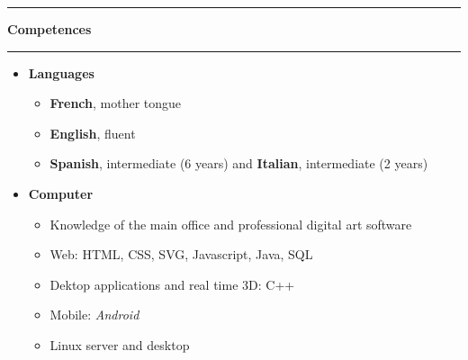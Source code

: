\documentclass[a4paper,11pt]{article} %
\newcommand{\trad}[2]{#1}
\newcommand{\titre}[1]{%
	\begin{center}
	\rule{\textwidth}{1pt}
	\par
	\vspace{0.1cm}
        \textbf{\large #1}
	\par\rule{\textwidth}{1pt}
	\end{center}
	}
\newenvironment{customitemize}[0]
  { \begin{itemize}
    \addtolength{\itemsep}{\trad{-0.2}{0}\baselineskip}
    \addtolength{\baselineskip}{\trad{-0.2}{0}\baselineskip} }
  { \end{itemize} }
\begin{document}
\titre{\trad{Competences}{Compétences}}

\begin{customitemize}
\item \textbf{\trad{Languages}{Langues}}
	\begin{itemize} 
	\trad{\item \textbf{French}, mother tongue}{}
	\item \trad{\textbf{English}, fluent} %
				{\textbf{Anglais}, autonome} %
	\item \trad{\textbf{Spanish}, intermediate (6 years) and \textbf{Italian}, intermediate (2 years)}
				{\textbf{Espagnol}, niveau intermédiaire (6 années d'études) et \textbf{Italien}, niveau intermédiaire (2 années d'études)}
	\end{itemize}
\item \textbf{\trad{Computer}{Informatique}}
	\begin{itemize}
	\item \trad{Knowledge of the main office and professional digital art software}             {Maîtrise des principaux outils de bureautique et d'infographie professionnelle}
	\item \trad{Web: HTML, CSS, SVG, Javascript, Java, SQL}										{Programmation web : HTML, CSS, SVG, Javascript, Java, SQL}
	\item \trad{Dektop applications and real time 3D: C++}										{C++ (applications de bureau, 3D temps réel)}
	\item \trad{Mobile: \textit{Android}}									  					{Programmation mobile : \textit{Android}}
	\item \trad{Linux server and desktop}                                                       {Utilisation quotidienne d'environnements Linux et administration de serveurs Linux}
	\end{itemize}
\end{customitemize}
\end{document}
